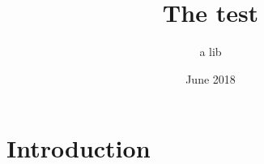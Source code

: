 \documentclass{article}
\title{The test}
\author{a lib}
\date{June 2018}
\begin{document}
\maketitle

\section{Introduction}
\end{document}
